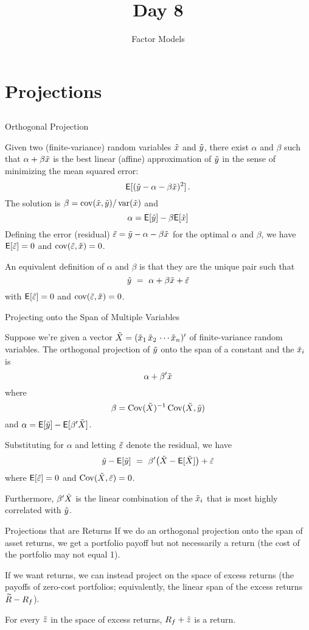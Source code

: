 \documentclass[xcolor=dvipsnames,10pt]{beamer}
\title{\vskip 0.5in Day 8}
\subtitle{Factor Models}
\begin{document}

\begin{frame}[plain]
  \titlepage
\end{frame}

\section{Projections}\subsection{}

\begin{frame}{Orthogonal Projection}

Given two (finite-variance) random variables $\tilde{x}$ and $\tilde{y}$, there exist $\alpha$ and $\beta$ such that $\alpha + \beta \tilde{x}$ is the best linear (affine) approximation of $\tilde{y}$ in the sense of minimizing the mean squared error:
$$ \mathsf{E}[(\tilde{y} - \alpha - \beta \tilde{x})^2]\,.$$
The solution is $\beta = \operatorname{cov}(\tilde{x},\tilde{y})/\operatorname{var}(\tilde{x})$ and 
$$\alpha = \mathsf{E}[\tilde{y}] - \beta \mathsf{E}[\tilde{x}]$$
Defining the error (residual) $\tilde{\varepsilon} = \tilde{y} - \alpha - \beta \tilde{x}$ for the optimal $\alpha$ and $\beta$, we have  $\mathsf{E}[\tilde{\varepsilon}]= 0$ and $\operatorname{cov}(\tilde{\varepsilon},\tilde{x})=0$.

An equivalent definition of $\alpha$ and $\beta$ is that they are the unique pair such that
$$\tilde{y} \ = \ \alpha + \beta \tilde{x} + \tilde{\varepsilon}$$
with $\mathsf{E}[\tilde{\varepsilon}]= 0$ and $\operatorname{cov}(\tilde{\varepsilon},\tilde{x})=0$.
\end{frame}


\begin{frame}{Projecting onto the Span of Multiple Variables}

Suppose we're given a vector $\tilde{X} = (\tilde{x}_1 \, \tilde{x}_2 \, \cdots \tilde{x}_n)'$ of finite-variance random variables.  The orthogonal projection of $\tilde{y}$ onto the span of a constant and the $\tilde{x}_i$ is
$$\alpha + \beta'\tilde{x}$$
where
$$\beta = \operatorname{Cov}(\tilde{X})^{-1}\operatorname{Cov}(\tilde{X},\tilde{y})$$
and $\alpha = \mathsf{E}[\tilde{y}] - \mathsf{E}[\beta'\tilde{X}]$. 

Substituting for $\alpha$ and letting $\tilde{\varepsilon}$ denote the residual, we have
$$\ty - \mye[\ty] \ = \ \beta'\big(\tX - \mye[\tX]\big) + \tve$$
where $\mathsf{E}[\tilde{\varepsilon}]=0$ and $\operatorname{Cov}(\tilde{X},\tilde{\varepsilon})=0$.

Furthermore, $\beta'\tilde{X}$ is the linear combination of the $\tilde{x}_i$ that is most highly correlated with $\tilde{y}$.
\end{frame}

\begin{frame}{Projections that are Returns}
If we do an orthogonal projection onto the span of asset returns, we get a portfolio payoff but not necessarily a return (the cost of the portfolio may not equal 1).

If we want returns, we can instead project on the space of excess returns (the payoffs of zero-cost portfolios; equivalently, the linear span of the excess returns $\widetilde{R}-R_f$).  

For every $\tilde{z}$ in the space of excess returns, $R_f + \tilde{z}$ is a return.
\end{frame}
\end{document}
